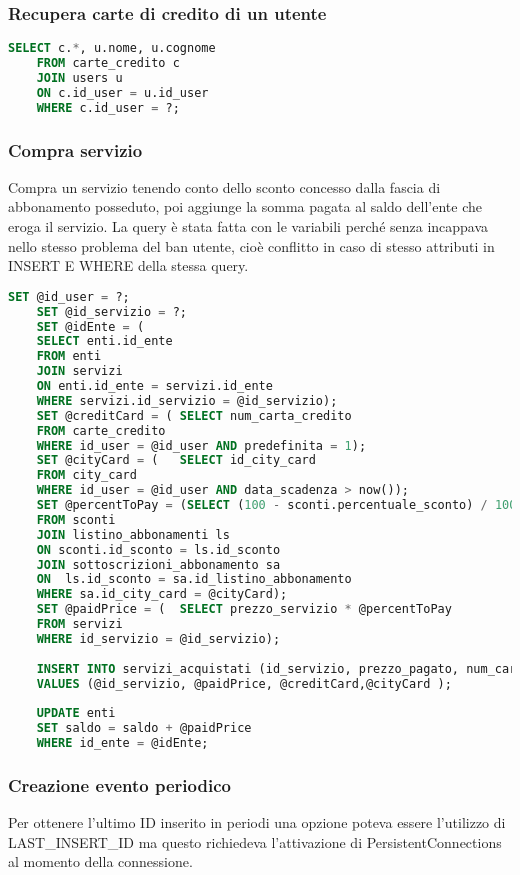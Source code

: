 \subsubsection{Recupera carte di credito di un utente}
\begin{lstlisting}[language=SQL]
	SELECT c.*, u.nome, u.cognome
	FROM carte_credito c
	JOIN users u
	ON c.id_user = u.id_user
	WHERE c.id_user = ?;
\end{lstlisting}


\subsubsection{Compra servizio}
Compra un servizio tenendo conto dello sconto concesso dalla fascia di abbonamento posseduto, poi aggiunge la somma pagata al saldo dell'ente che eroga il servizio.
La query è stata fatta con le variabili perché senza incappava nello stesso problema del ban utente, cioè conflitto in caso di stesso attributi in INSERT E WHERE della stessa query.
\begin{lstlisting}[language=SQL]
	SET @id_user = ?;
	SET @id_servizio = ?;
	SET @idEnte = (
	SELECT enti.id_ente 
	FROM enti
	JOIN servizi
	ON enti.id_ente = servizi.id_ente
	WHERE servizi.id_servizio = @id_servizio);
	SET @creditCard = ( SELECT num_carta_credito 
	FROM carte_credito
	WHERE id_user = @id_user AND predefinita = 1);
	SET @cityCard = (   SELECT id_city_card
	FROM city_card
	WHERE id_user = @id_user AND data_scadenza > now());
	SET @percentToPay = (SELECT (100 - sconti.percentuale_sconto) / 100
	FROM sconti 
	JOIN listino_abbonamenti ls 
	ON sconti.id_sconto = ls.id_sconto
	JOIN sottoscrizioni_abbonamento sa
	ON  ls.id_sconto = sa.id_listino_abbonamento
	WHERE sa.id_city_card = @cityCard);
	SET @paidPrice = (  SELECT prezzo_servizio * @percentToPay
	FROM servizi
	WHERE id_servizio = @id_servizio);
	
	INSERT INTO servizi_acquistati (id_servizio, prezzo_pagato, num_carta_credito, id_city_card) 
	VALUES (@id_servizio, @paidPrice, @creditCard,@cityCard );
	
	UPDATE enti 
	SET saldo = saldo + @paidPrice
	WHERE id_ente = @idEnte;
\end{lstlisting}




\subsubsection{Creazione evento periodico}
Per ottenere l'ultimo ID inserito in periodi una opzione poteva essere l'utilizzo di LAST{\_}INSERT{\_}ID ma questo richiedeva l'attivazione di PersistentConnections al momento della connessione.

